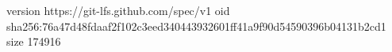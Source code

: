 version https://git-lfs.github.com/spec/v1
oid sha256:76a47d48fdaaf2f102c3eed340443932601ff41a9f90d54590396b04131b2cd1
size 174916
